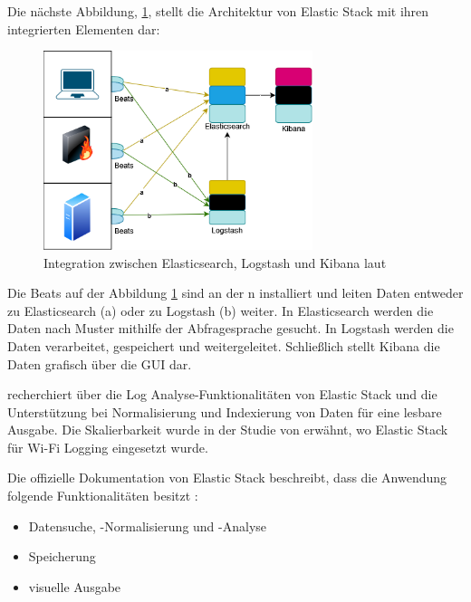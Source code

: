\newpage
Die nächste Abbildung, \ref{fig:Intregation_ELK}, stellt die Architektur von Elastic Stack mit ihren integrierten Elementen dar:

\begin{figure}[H]
   \centering
   \includegraphics[width=0.7\textwidth]{assets/ElasticStack.drawio.png}
   \caption[Integration zwischen Elasticsearch, Logstash und Kibana]
   {Integration zwischen Elasticsearch, Logstash und Kibana laut \cite{packt_elkstack} }
   \label{fig:Intregation_ELK}
   \centering
\end{figure}

Die Beats auf der Abbildung \ref{fig:Intregation_ELK} sind an der n installiert und leiten Daten entweder zu Elasticsearch (a) oder zu Logstash (b) weiter. In Elasticsearch werden die Daten nach Muster mithilfe der Abfragesprache  gesucht. In Logstash werden die Daten verarbeitet, gespeichert und weitergeleitet. Schließlich stellt Kibana die Daten grafisch über die \gls{GUI} dar\citep{Jain_LMELK}.

\cite{Advani_elkstakc} recherchiert über die Log Analyse-Funktionalitäten von Elastic Stack und die Unterstützung bei Normalisierung und Indexierung von Daten für eine lesbare Ausgabe. Die Skalierbarkeit wurde in der Studie von \cite{Wang_elkwifi} erwähnt, wo Elastic Stack für Wi-Fi Logging eingesetzt wurde.

Die offizielle Dokumentation von Elastic Stack beschreibt, dass die Anwendung folgende Funktionalitäten besitzt \citep{elastic_docs}:

\begin{itemize}[noitemsep]
   \item Datensuche, -Normalisierung und -Analyse
   \item Speicherung
   \item visuelle Ausgabe
\end{itemize}

